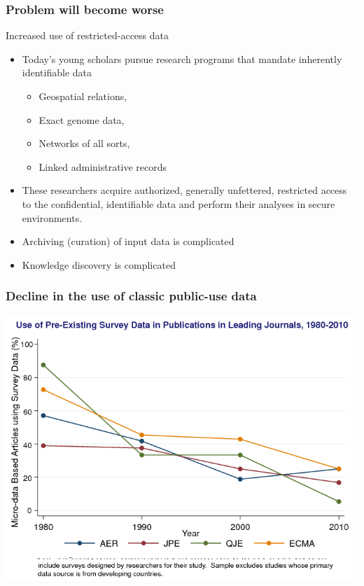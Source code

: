 \begin{frame}
\frametitle{Problem will become worse}
\begin{block}{Increased use of restricted-access data}
\begin{itemize}
\item Today's young scholars pursue research
programs that mandate inherently identifiable data
\begin{itemize}
\item Geospatial relations,
\item Exact genome data,
\item Networks of all sorts,
\item Linked administrative records
\end{itemize}
\item These researchers acquire authorized, generally unfettered, restricted access to the
confidential, identifiable data and perform their analyses in secure
environments.
\item Archiving (curation) of input data is complicated
\item Knowledge discovery is complicated
\end{itemize}
\end{block}
\end{frame}
\begin{frame}
\frametitle{Decline in the use of classic public-use data}
%
\includegraphics[width=0.7\paperwidth]{ChettySlide1}
\end{frame}

